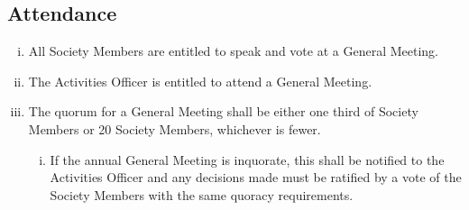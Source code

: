 \subsection{Attendance}
\begin{enumerate}[i.]
    \item All Society Members are entitled to speak and vote at a General Meeting.
    \item The Activities Officer is entitled to attend a General Meeting.
    \item The quorum for a General Meeting shall be either one third of Society Members or 20 Society Members, whichever is fewer.
    \begin{enumerate}[i.]
        \item If the annual General Meeting is inquorate, this shall be notified to the Activities Officer and any decisions made must be ratified by a vote of the Society Members with the same quoracy requirements.
    \end{enumerate}
\end{enumerate}